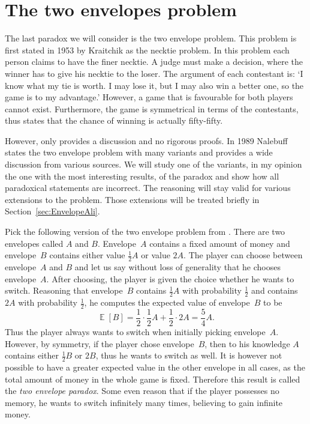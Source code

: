 \documentclass[a4paper]{report}
\theoremstyle{plain}
\theoremstyle{definition}
\theoremstyle{remark}
\numberwithin{equation}{chapter}
\DeclareMathOperator{\E}{\mathbb{E}}
\DeclareMathOperator{\1}{\mathbbm{1}}
\begin{document}
\chapter{The two envelopes problem}\label{chap:TwoEnvelope}
The last paradox we will consider is the two envelope problem. This problem is first stated in 1953 by Kraitchik \cite{Kraitchik53} as the necktie problem. In this problem each person claims to have the finer necktie. A judge must make a decision, where the winner has to give his necktie to the loser. The argument of each contestant is: `I know what my tie is worth. I may lose it, but I may also win a better one, so the game is to my advantage.' However, a game that is favourable for both players cannot exist. Furthermore, the game is symmetrical in terms of the contestants, thus \cite{Kraitchik53} states that the chance of winning is actually fifty-fifty.

However, \cite{Kraitchik53} only provides a discussion and no rigorous proofs. In 1989 Nalebuff \cite{Nalebuff89} states the two envelope problem with many variants and provides a wide discussion from various sources. We will study one of the variants, in my opinion the one with the most interesting results, of the paradox and show how all paradoxical statements are incorrect. The reasoning will stay valid for various extensions to the problem. Those extensions will be treated briefly in Section~\ref{sec:EnvelopeAli}.

Pick the following version of the two envelope problem from \cite{Nalebuff89}. There are two envelopes called $A$ and $B$. Envelope~$A$ contains a fixed amount of money and envelope~$B$ contains either value $\frac{1}{2}A$ or value $2A$. The player can choose between envelope~$A$ and $B$ and let us say without loss of generality that he chooses envelope~$A$. After choosing, the player is given the choice whether he wants to switch. Reasoning that envelope~$B$ contains $\frac{1}{2}A$ with probability $\frac{1}{2}$ and contains $2A$ with probability $\frac{1}{2}$, he computes the expected value of envelope~$B$ to be
\begin{equation}\label{eq:EnvelopeIntroWrong}
\E[B]=\frac{1}{2}\cdot\frac{1}{2}A+\frac{1}{2}\cdot2A=\frac{5}{4}A.
\end{equation}
Thus the player always wants to switch when initially picking envelope~$A$. However, by symmetry, if the player chose envelope~$B$, then to his knowledge $A$ contains either $\frac{1}{2}B$ or $2B$, thus he wants to switch as well. It is however not possible to have a greater expected value in the other envelope in all cases, as the total amount of money in the whole game is fixed. Therefore this result is called the \emph{two envelope paradox}. Some even reason that if the player possesses no memory, he wants to switch infinitely many times, believing to gain infinite money.
\end{document}
